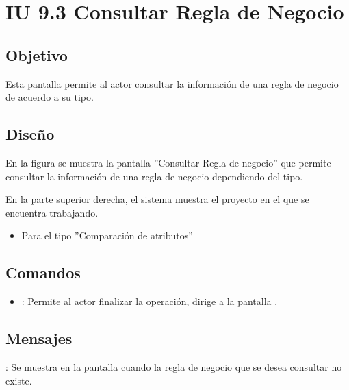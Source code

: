 \section{IU 9.3 Consultar Regla de Negocio}

\subsection{Objetivo}
	Esta pantalla permite al actor consultar la información de una regla de negocio de acuerdo a su tipo.
\subsection{Diseño}
	En la figura  se muestra la pantalla ''Consultar Regla de negocio'' que permite consultar la información de una regla de negocio dependiendo del tipo.
	
	
	En la parte superior derecha, el sistema muestra el proyecto en el que se encuentra trabajando.
	\begin{itemize}
		\item Para el tipo ''Comparación de atributos''
	\end{itemize}
\subsection{Comandos}
\begin{itemize}
	\item {}: Permite al actor finalizar la operación, dirige a la pantalla .
\end{itemize}

\subsection{Mensajes}

\begin{Citemize}
	\item {}: Se muestra en la pantalla  cuando la regla de negocio que se desea consultar no existe.
\end{Citemize}
